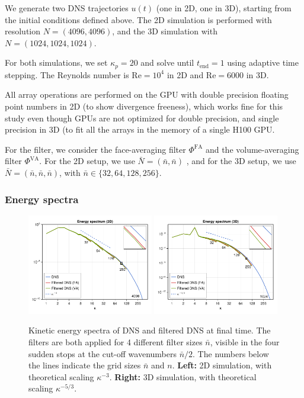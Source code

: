 \documentclass[preprint]{elsarticle}
\newcommand{\revtwo}[1]{#1}
\begin{document}
We generate two DNS trajectories $u(t)$ (one in 2D, one in 3D), starting from
the initial conditions defined above. The 2D simulation is performed with
resolution $N = (4096, 4096)$, and the 3D simulation with
\revtwo{ $N = (1024, 1024, 1024)$}.
\revtwo{
    
    For both simulations, we set $\kappa_p = 20$ and
    solve until $t_\text{end} = 1$ using adaptive time stepping.
    The Reynolds number is $\mathrm{Re} = 10^4$ in 2D
    and $\mathrm{Re} = 6000$ in 3D.
}
All array operations are performed on the GPU with double precision floating
point numbers
\revtwo{in 2D}
(to show divergence freeness), which works fine for this study even though GPUs
are not optimized for double precision, \revtwo{and single precision in 3D (to
fit all the arrays in the memory of a single H100 GPU}.

For the filter, we consider the face-averaging filter $\Phi^\text{FA}$ and the
volume-averaging filter $\Phi^\text{VA}$.
For the 2D setup, we use $\bar{N} = (\bar{n}, \bar{n})$
\revtwo{, and }
for the 3D setup, we use $\bar{N} = (\bar{n}, \bar{n}, \bar{n})$,
with \revtwo{$\bar{n} \in \{32, 64, 128, 256\}$}.

\subsubsection{Energy spectra}

\begin{figure}
    \centering
    \includegraphics[width=0.49\textwidth]{figures_prioranalysis_D=2_spectra.pdf}
    \includegraphics[width=0.49\textwidth]{figures_prioranalysis_D=3_spectra.pdf}
    \caption{
        Kinetic energy spectra of DNS and filtered DNS at final time.
        The filters are both applied for \revtwo{ 4}
        different filter sizes $\bar{n}$,
        visible in the \revtwo{ four} sudden stops at the cut-off wavenumbers
        $\bar{n} / 2$.
        \revtwo{The numbers below the lines indicate the grid sizes $\bar{n}$ and $n$.}
        \textbf{Left:} 2D simulation, with theoretical scaling $\kappa^{-3}$.
        \textbf{Right:} 3D simulation, with theoretical scaling $\kappa^{-5 / 3}$.
    }
    \label{fig:priorspectra}
\end{figure}
\end{document}
